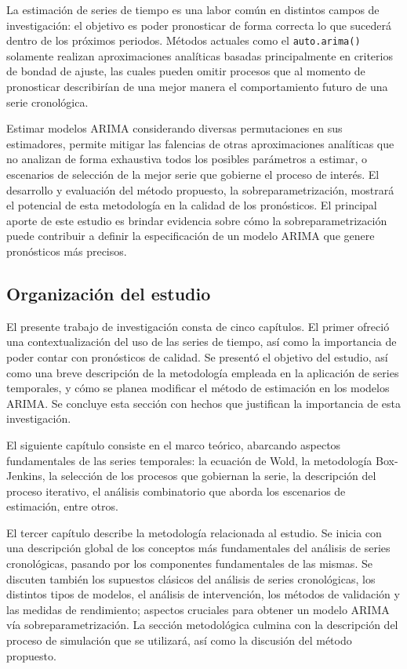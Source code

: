 \documentclass[
]{article}
\begin{document}
La estimación de series de tiempo es una labor común en distintos campos
de investigación: el objetivo es poder pronosticar de forma correcta lo
que sucederá dentro de los próximos periodos. Métodos actuales como el
\texttt{auto.arima()} solamente realizan aproximaciones analíticas
basadas principalmente en criterios de bondad de ajuste, las cuales
pueden omitir procesos que al momento de pronosticar describirían de una
mejor manera el comportamiento futuro de una serie cronológica.

Estimar modelos ARIMA considerando diversas permutaciones en sus
estimadores, permite mitigar las falencias de otras aproximaciones
analíticas que no analizan de forma exhaustiva todos los posibles
parámetros a estimar, o escenarios de selección de la mejor serie que
gobierne el proceso de interés. El desarrollo y evaluación del método
propuesto, la sobreparametrización, mostrará el potencial de esta
metodología en la calidad de los pronósticos. El principal aporte de
este estudio es brindar evidencia sobre cómo la sobreparametrización
puede contribuir a definir la especificación de un modelo ARIMA que
genere pronósticos más precisos.

\subsection{Organización del estudio}

El presente trabajo de investigación consta de cinco capítulos. El
primer ofreció una contextualización del uso de las series de tiempo,
así como la importancia de poder contar con pronósticos de calidad. Se
presentó el objetivo del estudio, así como una breve descripción de la
metodología empleada en la aplicación de series temporales, y cómo se
planea modificar el método de estimación en los modelos ARIMA. Se
concluye esta sección con hechos que justifican la importancia de esta
investigación.

El siguiente capítulo consiste en el marco teórico, abarcando aspectos
fundamentales de las series temporales: la ecuación de Wold, la
metodología Box-Jenkins, la selección de los procesos que gobiernan la
serie, la descripción del proceso iterativo, el análisis combinatorio
que aborda los escenarios de estimación, entre otros.

El tercer capítulo describe la metodología relacionada al estudio. Se
inicia con una descripción global de los conceptos más fundamentales del
análisis de series cronológicas, pasando por los componentes
fundamentales de las mismas. Se discuten también los supuestos clásicos
del análisis de series cronológicas, los distintos tipos de modelos, el
análisis de intervención, los métodos de validación y las medidas de
rendimiento; aspectos cruciales para obtener un modelo ARIMA vía
sobreparametrización. La sección metodológica culmina con la descripción
del proceso de simulación que se utilizará, así como la discusión del
método propuesto.
\end{document}
